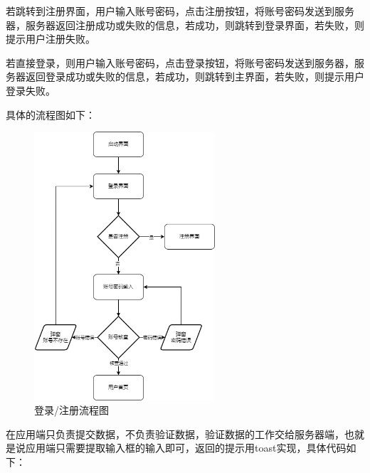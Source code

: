 \documentclass[UTF8,12pt]{article}
\begin{document}
若跳转到注册界面，用户输入账号密码，点击注册按钮，将账号密码发送到服务器，服务器返回注册成功或失败的信息，若成功，则跳转到登录界面，若失败，则提示用户注册失败。

若直接登录，则用户输入账号密码，点击登录按钮，将账号密码发送到服务器，服务器返回登录成功或失败的信息，若成功，则跳转到主界面，若失败，则提示用户登录失败。

具体的流程图如下：

\begin{figure}[htbp]
    \centering
    \includegraphics[width=0.6\textwidth]{imgs/14.png}
    \caption{登录/注册流程图}
\end{figure}

\newpage

在应用端只负责提交数据，不负责验证数据，验证数据的工作交给服务器端，也就是说应用端只需要提取输入框的输入即可，返回的提示用toast实现，具体代码如下：
\end{document}
